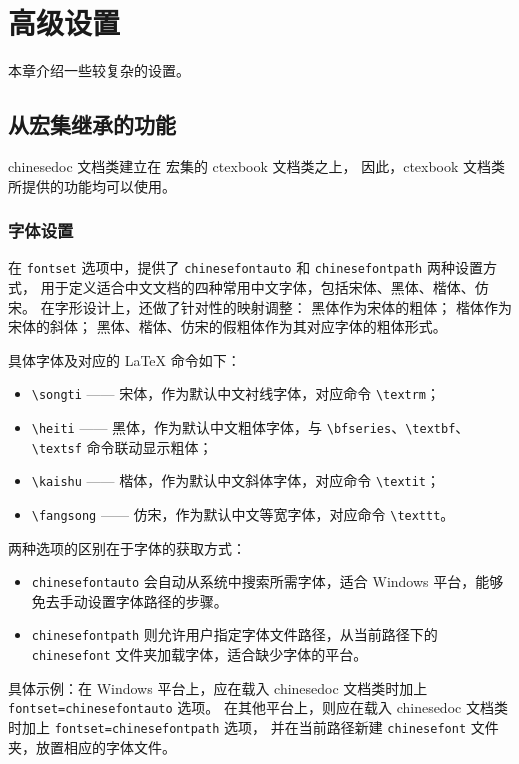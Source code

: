 \chapter{高级设置}
本章介绍一些较复杂的设置。

\section{从\CTeX{}宏集继承的功能}
\label{sec:ctex}
chinesedoc 文档类建立在 \CTeX{}宏集的 ctexbook 文档类之上，
因此，ctexbook 文档类所提供的功能均可以使用。

\subsection{字体设置}

在 \texttt{fontset} 选项中，提供了 \texttt{chinesefontauto} 和 \texttt{chinesefontpath} 两种设置方式，
用于定义适合中文文档的四种常用中文字体，包括宋体、黑体、楷体、仿宋。
在字形设计上，还做了针对性的映射调整：
黑体作为宋体的粗体；
楷体作为宋体的斜体；
黑体、楷体、仿宋的假粗体作为其对应字体的粗体形式。

具体字体及对应的 LaTeX 命令如下：
\begin{itemize}
    \item \verb|\songti| —— 宋体，作为默认中文衬线字体，对应命令 \verb|\textrm|；
    \item \verb|\heiti| —— 黑体，作为默认中文粗体字体，与 \verb|\bfseries|、\verb|\textbf|、\verb|\textsf| 命令联动显示粗体；
    \item \verb|\kaishu| —— 楷体，作为默认中文斜体字体，对应命令 \verb|\textit|；
    \item \verb|\fangsong| —— 仿宋，作为默认中文等宽字体，对应命令 \verb|\texttt|。
\end{itemize}

两种选项的区别在于字体的获取方式：
\begin{itemize}
    \item \texttt{chinesefontauto} 会自动从系统中搜索所需字体，适合 Windows 平台，能够免去手动设置字体路径的步骤。
    \item \texttt{chinesefontpath} 则允许用户指定字体文件路径，从当前路径下的 \texttt{chinesefont} 文件夹加载字体，适合缺少字体的平台。
\end{itemize}

具体示例：在 Windows 平台上，应在载入 chinesedoc 文档类时加上 \texttt{fontset=chinesefontauto} 选项。
在其他平台上，则应在载入 chinesedoc 文档类时加上 \texttt{fontset=chinesefontpath} 选项，
并在当前路径新建 \texttt{chinesefont} 文件夹，放置相应的字体文件。

